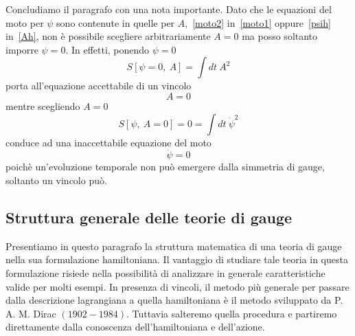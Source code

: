     \hfill

    Concludiamo il paragrafo con una nota importante. Dato che le equazioni del moto per $\psi$ sono contenute in quelle per $A$,~\eqref{moto2} in~\eqref{moto1} oppure~\eqref{psih} in~\eqref{Ah}, non è possibile scegliere arbitrariamente $A = 0$ ma posso soltanto imporre $\psi = 0$. In effetti, ponendo $\psi = 0$ 
    \begin{equation*}
        S[\psi = 0,~A] = \int dt ~ A^2
    \end{equation*}
    porta all'equazione accettabile di un vincolo
    \begin{equation*}
        A = 0
    \end{equation*}
    mentre scegliendo $A = 0$ 
    \begin{equation*}
        S[\psi,~A=0]=0 = \int dt ~\dot \psi^2
    \end{equation*}
    conduce ad una inaccettabile equazione del moto 
    \begin{equation*}
        \ddot \psi = 0
    \end{equation*}
    poichè un'evoluzione temporale non può emergere dalla simmetria di gauge, soltanto un vincolo può.

\subsection{Struttura generale delle teorie di gauge} 

    Presentiamo in questo paragrafo la struttura matematica di una teoria di gauge nella sua formulazione hamiltoniana. Il vantaggio di studiare tale teoria in questa formulazione risiede nella possibilità di analizzare in generale caratteristiche valide per molti esempi. In presenza di vincoli, il metodo più generale per passare dalla descrizione lagrangiana a quella hamiltoniana è il metodo sviluppato da P. A. M. Dirac $(1902- 1984)$. Tuttavia salteremo quella procedura e partiremo direttamente dalla conoscenza dell'hamiltoniana e dell'azione. 
    

